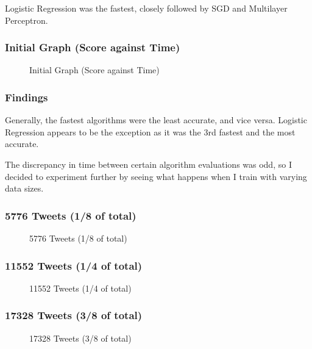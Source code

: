 \documentclass{article}
\begin{document}
Logistic Regression was the fastest, closely followed by SGD and Multilayer Perceptron.

\subsubsection{Initial Graph (Score against Time)}

\begin{figure}[H]
	\caption{Initial Graph (Score against Time)}
\end{figure}

\subsubsection{Findings}

Generally, the fastest algorithms were the least accurate, and vice versa.
Logistic Regression appears to be the exception as it was the 3rd fastest and the most accurate.

The discrepancy in time between certain algorithm evaluations was odd, so I decided to experiment further by seeing what happens when I train with varying data sizes.

\subsubsection{5776 Tweets (1/8 of total)}

\begin{figure}[H]
	\caption{5776 Tweets (1/8 of total)}
\end{figure}

\subsubsection{11552 Tweets (1/4 of total)}

\begin{figure}[H]
	\caption{11552 Tweets (1/4 of total)}
\end{figure}

\subsubsection{17328 Tweets (3/8 of total)}

\begin{figure}[H]
	\caption{17328 Tweets (3/8 of total)}
\end{figure}
\end{document}
